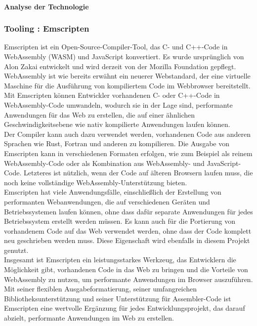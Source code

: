 \paragraph*{Analyse der Technologie}

\subsubsection{Tooling : Emscripten}
Emscripten ist ein Open-Source-Compiler-Tool, das C- und C++-Code in WebAssembly (WASM) und JavaScript konvertiert. Es wurde ursprünglich von Alon Zakai entwickelt und wird derzeit von der Mozilla Foundation gepflegt. \\
WebAssembly ist wie bereits erwähnt ein neuerer Webstandard, der eine virtuelle Maschine für die Ausführung von kompiliertem Code im Webbrowser bereitstellt. Mit Emscripten können Entwickler vorhandenen C- oder C++-Code in WebAssembly-Code umwandeln, wodurch sie in der Lage sind, performante Anwendungen für das Web zu erstellen, die auf einer ähnlichen Geschwindigkeitsebene wie nativ kompilierte Anwendungen laufen können. \\
Der Compiler kann auch dazu verwendet werden, vorhandenen Code aus anderen Sprachen wie Rust, Fortran und anderen zu kompilieren. Die Ausgabe von Emscripten kann in verschiedenen Formaten erfolgen, wie zum Beispiel als reinem WebAssembly-Code oder als Kombination aus WebAssembly- und JavaScript-Code. Letzteres ist nützlich, wenn der Code auf älteren Browsern laufen muss, die noch keine vollständige WebAssembly-Unterstützung bieten. \\
Emscripten hat viele Anwendungsfälle, einschließlich der Erstellung von performanten Webanwendungen, die auf verschiedenen Geräten und Betriebssystemen laufen können, ohne dass dafür separate Anwendungen für jedes Betriebssystem erstellt werden müssen. Es kann auch für die Portierung von vorhandenem Code auf das Web verwendet werden, ohne dass der Code komplett neu geschrieben werden muss. Diese Eigenschaft wird ebenfalls in diesem Projekt genutzt. \\
Insgesamt ist Emscripten ein leistungsstarkes Werkzeug, das Entwicklern die Möglichkeit gibt, vorhandenen Code in das Web zu bringen und die Vorteile von WebAssembly zu nutzen, um performante Anwendungen im Browser auszuführen. Mit seiner flexiblen Ausgabeformatierung, seiner umfangreichen Bibliotheksunterstützung und seiner Unterstützung für Assembler-Code ist Emscripten eine wertvolle Ergänzung für jedes Entwicklungsprojekt, das darauf abzielt, performante Anwendungen im Web zu erstellen. \\

